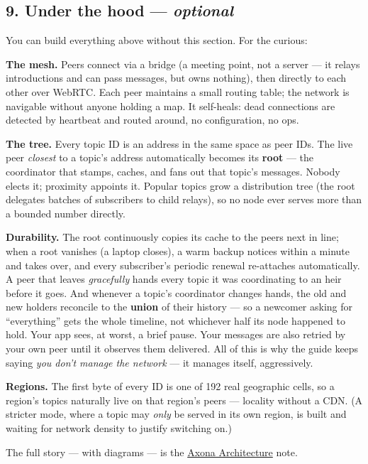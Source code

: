 \documentclass[
  nobib]{tufte-handout}
\begin{document}
\subsection{\texorpdfstring{9. Under the hood ---
\emph{optional}}{9. Under the hood --- optional}}\label{under-the-hood-optional}

You can build everything above without this section. For the curious:

\textbf{The mesh.} Peers connect via a bridge (a meeting point, not a
server --- it relays introductions and can pass messages, but owns
nothing), then directly to each other over WebRTC. Each peer maintains a
small routing table; the network is navigable without anyone holding a
map. It self-heals: dead connections are detected by heartbeat and
routed around, no configuration, no ops.

\textbf{The tree.} Every topic ID is an address in the same space as
peer IDs. The live peer \emph{closest} to a topic's address
automatically becomes its \textbf{root} --- the coordinator that stamps,
caches, and fans out that topic's messages. Nobody elects it; proximity
appoints it. Popular topics grow a distribution tree (the root delegates
batches of subscribers to child relays), so no node ever serves more
than a bounded number directly.

\textbf{Durability.} The root continuously copies its cache to the peers
next in line; when a root vanishes (a laptop closes), a warm backup
notices within a minute and takes over, and every subscriber's periodic
renewal re-attaches automatically. A peer that leaves \emph{gracefully}
hands every topic it was coordinating to an heir before it goes. And
whenever a topic's coordinator changes hands, the old and new holders
reconcile to the \textbf{union} of their history --- so a newcomer
asking for ``everything'' gets the whole timeline, not whichever half
its node happened to hold. Your app sees, at worst, a brief pause. Your
messages are also retried by your own peer until it observes them
delivered. All of this is why the guide keeps saying \emph{you don't
manage the network} --- it manages itself, aggressively.

\textbf{Regions.} The first byte of every ID is one of 192 real
geographic cells, so a region's topics naturally live on that region's
peers --- locality without a CDN. (A stricter mode, where a topic may
\emph{only} be served in its own region, is built and waiting for
network density to justify switching on.)

The full story --- with diagrams --- is the
\href{../architecture/Axona-Architecture.tex}{Axona Architecture} note.
\end{document}
